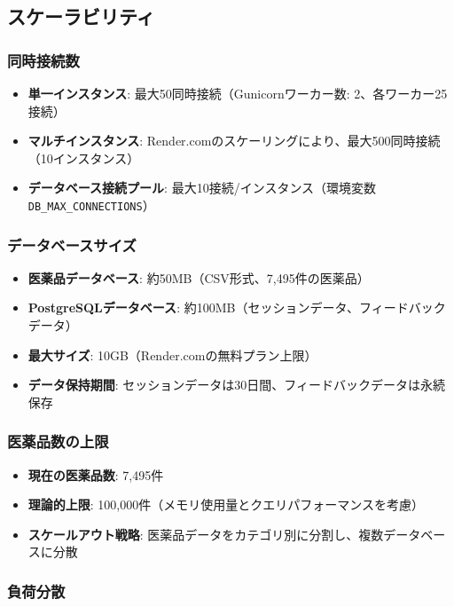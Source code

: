 \documentclass[a4paper,11pt,ja=standard,xelatex]{bxjsarticle}
\theoremstyle{definition}
\begin{document}
\subsection{スケーラビリティ}

\subsubsection{同時接続数}

\begin{itemize}
\item \textbf{単一インスタンス}: 最大50同時接続（Gunicornワーカー数: 2、各ワーカー25接続）
\item \textbf{マルチインスタンス}: Render.comのスケーリングにより、最大500同時接続（10インスタンス）
\item \textbf{データベース接続プール}: 最大10接続/インスタンス（環境変数\texttt{DB\_MAX\_CONNECTIONS}）
\end{itemize}

\subsubsection{データベースサイズ}

\begin{itemize}
\item \textbf{医薬品データベース}: 約50MB（CSV形式、7,495件の医薬品）
\item \textbf{PostgreSQLデータベース}: 約100MB（セッションデータ、フィードバックデータ）
\item \textbf{最大サイズ}: 10GB（Render.comの無料プラン上限）
\item \textbf{データ保持期間}: セッションデータは30日間、フィードバックデータは永続保存
\end{itemize}

\subsubsection{医薬品数の上限}

\begin{itemize}
\item \textbf{現在の医薬品数}: 7,495件
\item \textbf{理論的上限}: 100,000件（メモリ使用量とクエリパフォーマンスを考慮）
\item \textbf{スケールアウト戦略}: 医薬品データをカテゴリ別に分割し、複数データベースに分散
\end{itemize}

\subsubsection{負荷分散}
\end{document}
